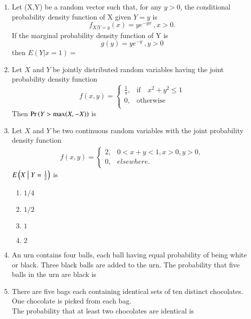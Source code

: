 \documentclass[journal,12pt,twocolumn]{IEEEtran}
\begin{document}
\begin{enumerate}
\solution

%
\item Let (X,Y) be a random vector such that, for any $y>0$, the conditional probability density function of X given $Y=y$ is $$f_{X|Y=y}(x)=ye^{-yx} \:,x>0. $$ If the marginal probability density function of Y is $$g(y)=ye^{-y}\:,y>0$$ then $E(Y|x=1)=$
\\
\solution

%
\item Let $X$ and $Y$ be jointly distributed random
variables having the joint probability
density function
\[
f(x,y) = \begin{cases}
            \frac{1}{\pi}, &\text{if}\quad x^2 + y^2 \leq 1\\
             0, &\text{otherwise}\\
            \end{cases}
\]
Then $\Pr\left(Y > \text{max}(X,-X)\right)$ is
\\
\solution 

%
\item Let $X$ and $Y$ be two continuous random variables with the joint probability density function
\begin{align}
    f(x,y) =
    \begin{cases}
    2, & 0<x+y<1, x>0, y>0,\\
    0, & elsewhere.
    \end{cases}
\end{align}
$E\left(X \bigm| Y=\frac{1}{2}\right)$ is
\begin{enumerate}
    \item $1/4$
    \item $1/2$
    \item $1$
    \item $2$
\end{enumerate}
\solution

%
\item An urn contains four balls, each ball having equal probability of being white or black. Three black balls are added to the urn. The probability that five balls in the urn are black is
\\
\solution

%
\item There are five bags each containing identical sets of ten distinct chocolates. One chocolate is picked from each bag.\\
The probability that at least two chocolates are identical is
%
\\
\solution

%

\end{enumerate}
\end{document}
